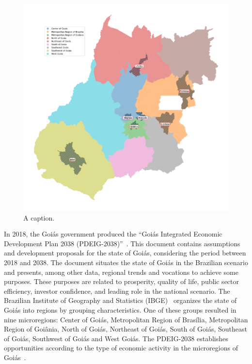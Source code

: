 \documentclass[sigconf, review]{educomp}
\begin{document}
\begin{figure}[!htbp]
    \centering
    \includegraphics[width=.9\linewidth]{Images/Map.png}%
    \caption{A caption.}
    \label{fig_map}%
\end{figure}
In 2018, the Goiás government produced the ``Goiás Integrated Economic Development Plan 2038 (PDEIG-2038)''~\cite{goias2038}.
This document contains assumptions and development proposals for the state of Goiás, considering the period between 2018 and 2038.
The document situates the state of Goiás in the Brazilian scenario and presents, among other data, regional trends and vocations to achieve some purposes.
These purposes are related to prosperity, quality of life, public sector efficiency, investor confidence, and leading role in the national scenario.
The Brazilian Institute of Geography and Statistics (IBGE)~\cite{ibge2020} organizes the state of Goiás into regions by grouping characteristics.
One of these groups resulted in nine microregions: Center of Goiás, Metropolitan Region of Brasília, Metropolitan Region of Goiânia, North of Goiás, Northeast of Goiás, South of Goiás, Southeast of Goiás, Southwest of Goiás and West Goiás.
The PDEIG-2038 establishes opportunities according to the type of economic activity in the microregions of Goiás~\cite{ibge2020}.
\end{document}
